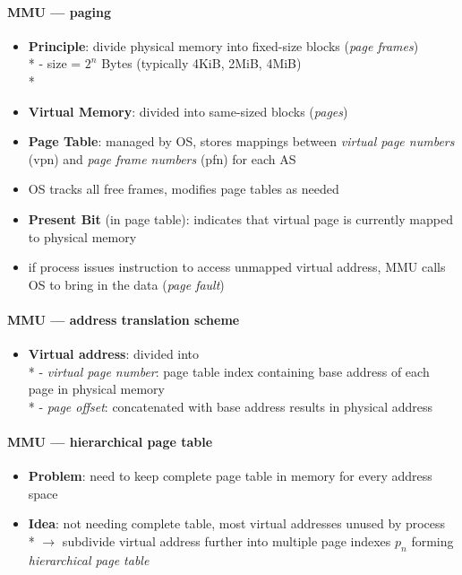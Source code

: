 \paragraph{MMU --- paging}
\begin{itemize}
  \item \textbf{Principle}: divide physical memory into fixed-size blocks (\emph{page frames}) \\*
    - size = \( 2^n \) Bytes (typically 4KiB, 2MiB, 4MiB) \\*
  \item \textbf{Virtual Memory}: divided into same-sized blocks (\emph{pages})
  \item \textbf{Page Table}: managed by OS, stores mappings between \emph{virtual page numbers} (vpn) and \emph{page frame numbers} (pfn) for each AS
  \item OS tracks all free frames, modifies page tables as needed
  \item \textbf{Present Bit} (in page table): indicates that virtual page is currently mapped to physical memory
  \item if process issues instruction to access unmapped virtual address, MMU calls OS to bring in the data (\emph{page fault})
\end{itemize}

\paragraph{MMU --- address translation scheme}
\begin{itemize}
  \item \textbf{Virtual address}: divided into \\*
    - \emph{virtual page number}: page table index containing base address of each page in physical memory \\*
    - \emph{page offset}: concatenated with base address results in physical address
\end{itemize}

\paragraph{MMU --- hierarchical page table}
\begin{itemize}
  \item \textbf{Problem}: need to keep complete page table in memory for every address space
  \item \textbf{Idea}: not needing complete table, most virtual addresses unused by process \\*
    \( \to \) subdivide virtual address further into multiple page indexes \( p_n \) forming \emph{hierarchical page table}
\end{itemize}

